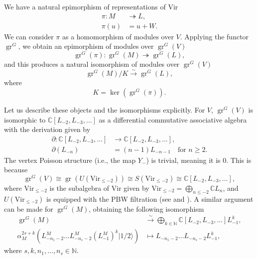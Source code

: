 \documentclass[a4paper, 12pt, reqno]{amsart}
\theoremstyle{remark}
\DeclareMathOperator{\gr}{gr}
\newcommand{\vachalf}{{|1/2\rangle}}
\newcommand{\Vir}{{\mathrm{Vir}}}
\begin{document}
We have a natural epimorphism of representations of $\Vir$
\begin{align*}
  \pi: M &\twoheadrightarrow L, \\
  \pi(u) &= u + W.
\end{align*}
We can consider $\pi$ as a homomorphism of modules over $V$.
Applying the functor $\gr^G$, we obtain an epimorphism of modules over $\gr^G(V)$
\begin{equation*}
  \gr^G(\pi): \gr^G(M) \twoheadrightarrow \gr^G(L),
\end{equation*}
and this produces a natural isomorphism of modules over $\gr^G(V)$
\begin{equation*}
  \gr^G(M)/K \xrightarrow{\sim} \gr^G(L),
\end{equation*}
where
\begin{equation}
  \label{eq:5}
  K = \ker(\gr^G(\pi)).
\end{equation}

Let us describe these objects and the isomorphisms explicitly.
For $V$, $\gr^G(V)$ is isomorphic to $\mathbb{C}[L_{-2}, L_{-3}, \dots]$ as a differential commutative associative algebra with the derivation given by
\begin{align*}
  \partial: \mathbb{C}[L_{-2}, L_{-3}, \dots] &\to \mathbb{C}[L_{-2}, L_{-3}, \dots], \\
  \partial(L_{-n}) &= (n - 1)L_{-n - 1} \quad \text{for $n \ge 2$}.
\end{align*}
The vertex Poisson structure (i.e., the map $Y_-$) is trivial, meaning it is $0$.
This is because
\begin{equation*}
  \gr^G(V) \cong \gr(U(\Vir_{\le -2})) \cong S(\Vir_{\le -2}) \cong \mathbb{C}[L_{-2}, L_{-3}, \dots],
\end{equation*}
where $\Vir_{\le -2}$ is the subalgebra of $\Vir$ given by $\Vir_{\le -2} = \bigoplus_{n \le -2}\mathbb{C}L_n$, and $U(\Vir_{\le -2})$ is equipped with the PBW filtration (see \cite[\S2]{dixmier_enveloping_1996} and \cite[(5.2.25)]{lepowsky_introduction_2004}).
A similar argument can be made for $\gr^G(M)$, obtaining the following isomorphism
\begin{align*}
  \gr^G(M) &\xrightarrow{\sim} \bigoplus_{k \in \mathbb{N}}\mathbb{C}[L_{-2}, L_{-3}, \dots]L_{-1}^k, \\
  \alpha_M^{2s + k}(L_{-n_1 - 2}^M\dots L_{-n_s - 2}^M(L_{-1}^M)^k\vachalf) &\mapsto L_{-n_1 - 2}\dots L_{-n_s - 2}L_{-1}^k,
\end{align*}
where $s, k, n_1, \dots, n_s \in \mathbb{N}$.
\end{document}
